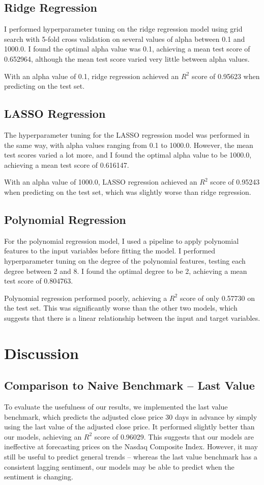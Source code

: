 \documentclass[a4paper, 11pt]{article}
\begin{document}
\subsection{Ridge Regression}
I performed hyperparameter tuning on the ridge regression model using grid search with 5-fold cross validation on several values of alpha between 0.1 and 1000.0. I found the optimal alpha value was 0.1, achieving a mean test score of 0.652964, although the mean test score varied very little between alpha values.

With an alpha value of 0.1, ridge regression achieved an $R^2$ score of 0.95623 when predicting on the test set.

\subsection{LASSO Regression}
The hyperparameter tuning for the LASSO regression model was performed in the same way, with alpha values ranging from 0.1 to 1000.0. However, the mean test scores varied a lot more, and I found the optimal alpha value to be 1000.0, achieving a mean test score of 0.616147.

With an alpha value of 1000.0, LASSO regression achieved an $R^2$ score of 0.95243 when predicting on the test set, which was slightly worse than ridge regression.

\subsection{Polynomial Regression}
For the polynomial regression model, I used a pipeline to apply polynomial features to the input variables before fitting the model. I performed hyperparameter tuning on the degree of the polynomial features, testing each degree between 2 and 8. I found the optimal degree to be 2, achieving a mean test score of 0.804763.

Polynomial regression performed poorly, achieving a $R^2$ score of only 0.57730 on the test set. This was significantly worse than the other two models, which suggests that there is a linear relationship between the input and target variables.

\section{Discussion}

\subsection{Comparison to Naive Benchmark -- Last Value}
To evaluate the usefulness of our results, we implemented the last value benchmark, which predicts the adjusted close price 30 days in advance by simply using the last value of the adjusted close price. It performed slightly better than our models, achieving an $R^2$ score of 0.96029. This suggests that our models are ineffective at forecasting prices on the Nasdaq Composite Index. However, it may still be useful to predict general trends -- whereas the last value benchmark has a consistent lagging sentiment, our models may be able to predict when the sentiment is changing.
\end{document}
